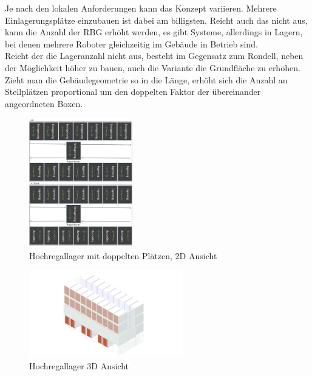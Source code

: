\clearpage

Je nach den lokalen Anforderungen kann das Konzept variieren. Mehrere Einlagerungsplätze einzubauen ist dabei am billigsten. Reicht auch das nicht aus, kann die Anzahl der \ac{RBG} erhöht werden, es gibt Systeme, allerdings in Lagern, bei denen mehrere Roboter gleichzeitig im Gebäude in Betrieb sind. \\
Reicht der die Lageranzahl nicht aus, besteht im Gegensatz zum Rondell, neben der Möglichkeit höher zu bauen, auch die Variante die Grundfläche zu erhöhen. Zieht man die Gebäudegeometrie so in die Länge, erhöht sich die Anzahl an Stellplätzen proportional um den doppelten Faktor der übereinander angeordneten Boxen. \\
\begin{figure}[H]
    \centering
    \includegraphics[width=0.4\textwidth]{images/hochregallager2ddoppelt.jpg}
    \caption{Hochregallager mit doppelten Plätzen, 2D Ansicht}
    \label{fig:hochregallager2ddoppelt}
\end{figure}
\begin{figure}[H]
    \centering
    \includegraphics[width=0.6\textwidth]{images/hochregallager3d.png}
    \caption{Hochregallager 3D Ansicht}
    \label{fig:hochregallager3d}
\end{figure}

